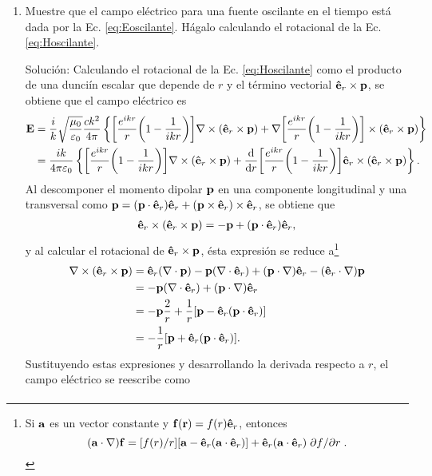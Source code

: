 \begin{enumerate}[label=\textbf{Ejercicio \thechapter.\arabic*},resume]
\item Muestre que el campo eléctrico para una fuente oscilante en el tiempo está dada por la Ec. \eqref{eq:Eoscilante}. Hágalo calculando el rotacional de la Ec.  \eqref{eq:Hoscilante}.
\label{ex:Eoscilante}
\item[\color{blue} Solución:]
	Calculando el rotacional de la Ec. \eqref{eq:Hoscilante} como el producto de una dunciín escalar que depende de $r$ y el término vectorial $\vu{e}_r\times\vb{p}$, se obtiene que el campo eléctrico es
	\begin{align*}
	\vb{E} &= \frac{i}{k}\sqrt{\frac{\mu_0}{\varepsilon_0}} \frac{ck^2}{4\pi}\left\{
		\qty[\frac{e^{ikr}}{r}\qty(1-\frac{1}{ikr})]\nabla\times(\vu{e}_r\times\vb{p}) +
	\nabla\qty[\frac{e^{ikr}}{r}\qty(1-\frac{1}{ikr})]\times(\vu{e}_r\times\vb{p}) 
	\right\}\\
		&= \frac{ik}{4\pi\varepsilon_0}\left\{
		\qty[\frac{e^{ikr}}{r}\qty(1-\frac{1}{ikr})]\nabla\times(\vu{e}_r\times\vb{p}) +
	\dv{r}\qty[\frac{e^{ikr}}{r}\qty(1-\frac{1}{ikr})]\vu{e}_r\times(\vu{e}_r\times\vb{p}) 
	\right\}.
	\end{align*}
%
Al descomponer el momento dipolar $\vb{p}$ en una componente longitudinal y una transversal como $\vb{p} = (\vb{p}\cdot\vu{e}_r)\vu{e}_r + (\vb{p}\times\vu{e}_r)\times\vu{e}_r $, se obtiene que
%
\begin{align*}
	\vu{e}_r \times (\vu{e}_r \times \vb{p}) = - \vb{p} +  (\vb{p}\cdot\vu{e}_r)\vu{e}_r,
\end{align*}
%
y al calcular el rotacional de $\vu{e}_r\times\vb{p}$, ésta expresión se reduce a\footnote{Si $\vb{a}$ es un vector constante y $\vb{f}(\vb{r})=f(r)\vu{e}_r$, entonces \cite{jackson1999electrodynamics} $$(\vb{a}\cdot\nabla)\vb{f} = [f(r)/r][\vb{a}-\vu{e}_r(\vb{a}\cdot\vu{e}_r)]+\vu{e}_r(\vb{a}\cdot\vu{e}_r)\pdv*{f}{r}.$$}
%
\begin{align*}
\nabla\times (\vu{e}_r\times\vb{p}) &= \vu{e}_r(\nabla\cdot\vb{p}) - \vb{p}(\nabla\cdot\vu{e}_r) + (\vb{p}\cdot\nabla)\vu{e}_r-(\vu{e}_r\cdot\nabla)\vb{p}\\
	&=  - \vb{p}(\nabla\cdot\vu{e}_r) + (\vb{p}\cdot\nabla)\vu{e}_r\\
	&= -\vb{p}\frac{2}{r} + \frac{1}{r}\qty[\vb{p}-\vu{e}_r(\vb{p}\cdot\vu{e}_r)]\\
	&= -\frac{1}{r}[\vb{p}+\vu{e}_r(\vb{p}\cdot\vu{e}_r)].
\end{align*}
%
Sustituyendo estas expresiones y desarrollando la derivada respecto a $r$, el campo eléctrico se reescribe como
%
\begin{align*}

\end{align*}
\end{enumerate}
